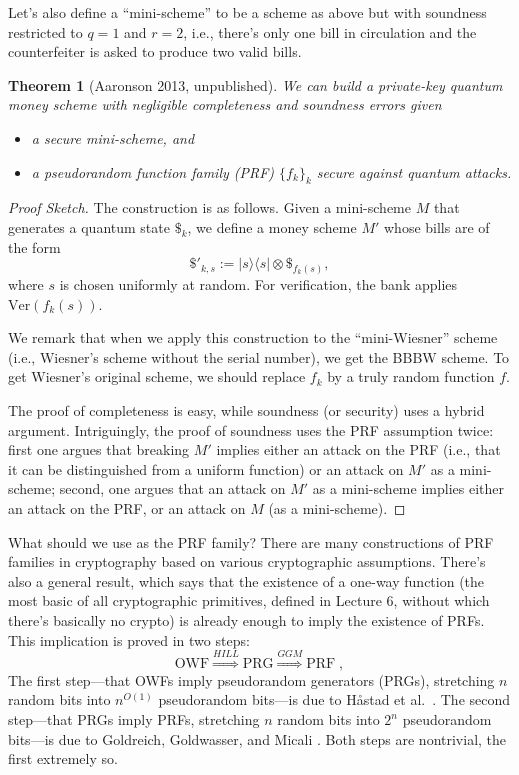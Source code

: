\documentclass[12pt]{report}
\theoremstyle{plain}
\newtheorem{theorem}{Theorem}[section]
\theoremstyle{definition}
\renewcommand{\bra}[1]{\langle#1|}
\renewcommand{\ket}[1]{|#1\rangle}
\begin{document}
Let's also define a ``mini-scheme'' to be a scheme as above but with soundness restricted to $q=1$ and $r=2$, i.e., there's only one bill in circulation and the counterfeiter is asked to produce two valid bills.

\begin{theorem}[Aaronson 2013, unpublished]
We can build a private-key quantum money scheme with negligible completeness and soundness errors given
\begin{itemize}
\item a secure mini-scheme, and
\item a pseudorandom function family (PRF) $\{f_k\}_k$ secure against quantum attacks.
\end{itemize}
\end{theorem}
\begin{proof}[Proof Sketch]
The construction is as follows. Given a mini-scheme $M$ that generates a quantum state $\$_k$, we define a money scheme $M'$ whose bills are of the form
$$\$'_{k,s} := \ket{s}\bra{s} \otimes \$_{f_k(s)},$$
where $s$ is chosen uniformly at random. For verification, the bank applies $\mathrm{Ver}(f_k(s))$.

We remark that when we apply this construction to the ``mini-Wiesner'' scheme (i.e., Wiesner's scheme without the serial number), we get the BBBW scheme.  To get Wiesner's original scheme, we should replace $f_k$ by a truly random function $f$.

The proof of completeness is easy, while soundness (or security) uses a hybrid argument.
Intriguingly, the proof of soundness uses the PRF assumption twice: first one argues that breaking $M'$ implies either an attack on the PRF (i.e., that it can be distinguished from a uniform function) or an attack on $M'$ as a mini-scheme; second, one argues that an attack on $M'$ as a mini-scheme implies either an attack on the PRF, or an attack on $M$ (as a mini-scheme).
\end{proof}

What should we use as the PRF family? There are many constructions of PRF families in cryptography based on various cryptographic assumptions.
There's also a general result, which says that the existence of a one-way function (the most basic of all cryptographic primitives, defined in Lecture 6, without which there's basically no crypto) is already enough to imply the existence of PRFs. This implication is proved in two steps:
\[
\mathrm{OWF} \stackrel{HILL}{\Longrightarrow} \mathrm{PRG} \stackrel{GGM}{\Longrightarrow} \mathrm{PRF} \; ,
\]
The first step---that OWFs imply pseudorandom generators (PRGs), stretching $n$ random bits into $n^{O(1)}$ pseudorandom bits---is due to H{\aa}stad et al.\ \cite{hill}.  The second step---that PRGs imply PRFs, stretching $n$ random bits into $2^n$ pseudorandom bits---is due to Goldreich, Goldwasser, and Micali \cite{ggm}.  Both steps are nontrivial, the first extremely so.
\end{document}
